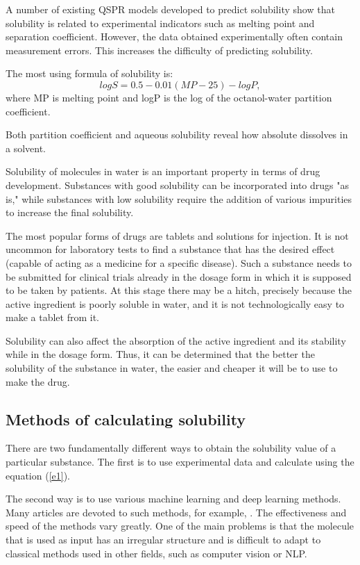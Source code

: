 \documentclass[a4paper,14pt]{article}
\begin{document}
A number of existing QSPR \cite{QSPR} models developed to predict solubility show that solubility is related to experimental indicators such as melting point and separation coefficient.
However, the data obtained experimentally often contain measurement errors. This increases the difficulty of predicting solubility.

The most using formula of solubility is:
\begin {equation}
\label{e1}
 logS =  0.5 - 0.01(MP - 25) - logP,
\end{equation}
where MP is melting point and logP is the log of the octanol-water partition coefficient.

Both partition coefficient and aqueous solubility reveal how
absolute dissolves in a solvent.

Solubility of molecules in water is an important property in terms of drug development. Substances with good solubility can be incorporated into drugs "as is," while substances with low solubility require the addition of various impurities to increase the final solubility. 

The most popular forms of drugs are tablets and solutions for injection. It is not uncommon for laboratory tests to find a substance that has the desired effect (capable of acting as a medicine for a specific disease). Such a substance needs to be submitted for clinical trials already in the dosage form in which it is supposed to be taken by patients. At this stage there may be a hitch, precisely because the active ingredient is poorly soluble in water, and it is not technologically easy to make a tablet from it.

Solubility can also affect the absorption of the active ingredient and its stability while in the dosage form. Thus, it can be determined that the better the solubility of the substance in water, the easier and cheaper it will be to use to make the drug.

\subsection{Methods of calculating solubility}
There are two fundamentally different ways to obtain the solubility value of a particular substance. The first is to use experimental data and calculate using the equation (\ref{e1}).

The second way is to use various machine learning and deep learning methods. Many articles are devoted to such methods, for example, \cite{Sol5}\cite{Sol6}. The effectiveness and speed of the methods vary greatly. One of the main problems is that the molecule that is used as input has an irregular structure and is difficult to adapt to classical methods used in other fields, such as computer vision or NLP.
\end{document}
